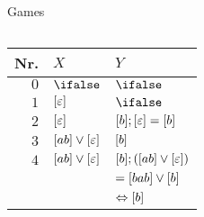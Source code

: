 \documentclass[../talk.tex]{subfiles}
\begin{document}
\begin{frame}{Games}
\begin{overlayarea}{\slidewidth}{\slideheight}
\begin{columns}[T]
\begin{column}{0.6\textwidth}
                \begin{tabular} {r||l|l}
                    Nr. & $X$ & $Y$\\
                    \hline
                    \hline
                     $0$ & $\ifalse$ & $\ifalse$ \\ \hline
                     $1$ & $[\varepsilon]$ & $\ifalse$ \\ \hline
                     $2$ & $[\varepsilon] $ & $[b];[\varepsilon] = [b]$ \\ \hline
                     $3$ & $[ab] \vee [\varepsilon]$ & $[b]$ \\ \hline
                     $4$ & $[ab] \vee [\varepsilon]$ & $[b];([ab] \vee [\varepsilon])$ \\
                     & & $= [bab] \vee [b]$ \\
                     & & $\Leftrightarrow [b]$
                \end{tabular}

            \end{column}
        \end{columns}

    \end{overlayarea}
\end{frame}
\end{document}
